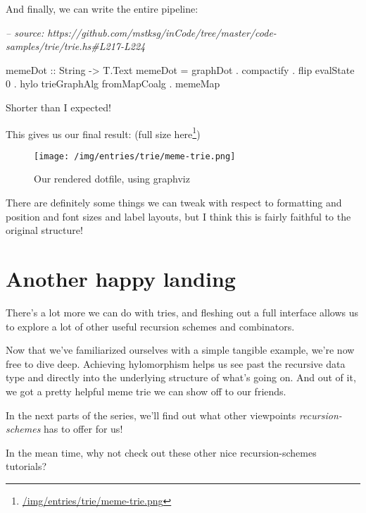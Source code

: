 \documentclass[]{article}
\newenvironment{Shaded}{}{}
\newcommand{\CommentTok}[1]{\textcolor[rgb]{0.38,0.63,0.69}{\textit{#1}}}
\newcommand{\DataTypeTok}[1]{\textcolor[rgb]{0.56,0.13,0.00}{#1}}
\newcommand{\DecValTok}[1]{\textcolor[rgb]{0.25,0.63,0.44}{#1}}
\newcommand{\FunctionTok}[1]{\textcolor[rgb]{0.02,0.16,0.49}{#1}}
\newcommand{\NormalTok}[1]{#1}
\newcommand{\OtherTok}[1]{\textcolor[rgb]{0.00,0.44,0.13}{#1}}
\renewcommand{\href}[2]{#2\footnote{\url{#1}}}
\begin{document}
And finally, we can write the entire pipeline:

\begin{Shaded}
\begin{Highlighting}[]
\CommentTok{-- source: https://github.com/mstksg/inCode/tree/master/code-samples/trie/trie.hs#L217-L224}

\NormalTok{memeDot}
\OtherTok{    ::} \DataTypeTok{String}
    \OtherTok{->} \DataTypeTok{T.Text}
\NormalTok{memeDot }\FunctionTok{=}\NormalTok{ graphDot}
        \FunctionTok{.}\NormalTok{ compactify}
        \FunctionTok{.}\NormalTok{ flip evalState }\DecValTok{0}
        \FunctionTok{.}\NormalTok{ hylo trieGraphAlg fromMapCoalg}
        \FunctionTok{.}\NormalTok{ memeMap}
\end{Highlighting}
\end{Shaded}

Shorter than I expected!

This gives us our final result: (\href{/img/entries/trie/meme-trie.png}{full
size here})

\begin{figure}
\centering
\texttt{[image: /img/entries/trie/meme-trie.png]}
\caption{Our rendered dotfile, using graphviz}
\end{figure}

There are definitely some things we can tweak with respect to formatting and
position and font sizes and label layouts, but I think this is fairly faithful
to the original structure!

\hypertarget{another-happy-landing}{%
\section{Another happy landing}\label{another-happy-landing}}

There's a lot more we can do with tries, and fleshing out a full interface
allows us to explore a lot of other useful recursion schemes and combinators.

Now that we've familiarized ourselves with a simple tangible example, we're now
free to dive deep. Achieving hylomorphism helps us see past the recursive data
type and directly into the underlying structure of what's going on. And out of
it, we got a pretty helpful meme trie we can show off to our friends.

In the next parts of the series, we'll find out what other viewpoints
\emph{recursion-schemes} has to offer for us!

In the mean time, why not check out these other nice recursion-schemes
tutorials?
\end{document}

